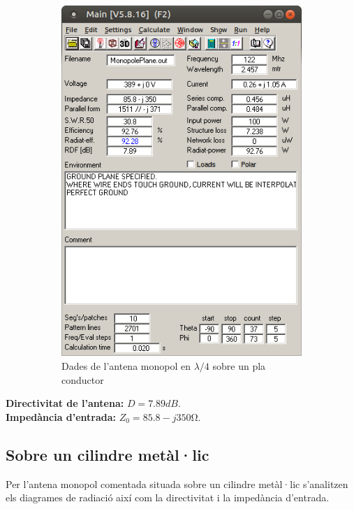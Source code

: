 \begin{figure}[H]
\begin{subfigure}[b]{0.32\textwidth}
	  \includegraphics[width=\textwidth]{./images/4.Monopole_plane/menu.png}
	  \caption{Dades de l'antena monopol en $\lambda/4$ sobre un pla conductor}
	  \label{2menu}
	  \end{subfigure}
	  \vspace{10pt}
	\caption{}
	\label{diag4}
	\end{figure}

	\textbf{Directivitat de l'antena:} $ D=7.89 dB$. \\
	\textbf{Impedància d'entrada:} $ Z_0=85.8-j350 \si{\ohm}$.

\newpage
 \subsection{Sobre un cilindre metàl·lic}

  Per l'antena monopol comentada situada sobre un cilindre metàl·lic s'analitzen els diagrames de radiació així com la directivitat i la impedància d'entrada.


